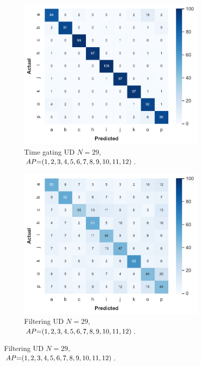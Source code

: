 \begin{figure}[!t]
    \begin{subfigure}{.49\textwidth}
        \centering
        \includegraphics[width=.99\linewidth]{Figures/RadarExperiments/Datasets/ThroughMaterials/Wood/confusion-timegating-ud.pdf}
        \vspace{-15pt}
        \captionsetup{width=.99\linewidth}
        \caption{Time gating UD $N{=}29$, \\ $\splitatcommas{AP{=}(1, 2, 3, 4, 5, 6, 7, 8, 9, 10, 11, 12)}$.}
        \label{fig:radar-experiments:through-materials:wood-confusion:timegating-ud}
    \end{subfigure}
    \begin{subfigure}{.49\textwidth}
        \centering
        \includegraphics[width=.99\linewidth]{Figures/RadarExperiments/Datasets/ThroughMaterials/Wood/confusion-filtering-ud.pdf}
        \vspace{-15pt}
        \captionsetup{width=.99\linewidth}
        \caption{Filtering UD $N{=}29$, \\ $\splitatcommas{AP{=}(1, 2, 3, 4, 5, 6, 7, 8, 9, 10, 11, 12)}$.}
        \label{fig:radar-experiments:through-materials:wood-confusion:filtering-ud}
    \end{subfigure}


\end{figure}
